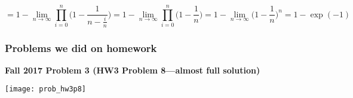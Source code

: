 \[
= 1 - \lim_{n \to \infty} \prod_{i=0}^{n}\bigg(1-\frac{1}{n - \frac{i}{n}} \bigg) = 1 - \lim_{n \to \infty} \prod_{i=0}^{n}\bigg(1-\frac{1}{n} \bigg) = 1 - \lim_{n \to \infty}  \bigg(1 - \frac{1}{n} \bigg)^n = \boxed{1 - \exp(-1)}
\]


\subsubsection{Problems we did on homework}

%
%
%
%
%
%
%
%
%
%
%
%


\textbf{Fall 2017 Problem 3 (HW3 Problem 8---almost full solution)}

\texttt{[image: prob\_hw3p8]}

